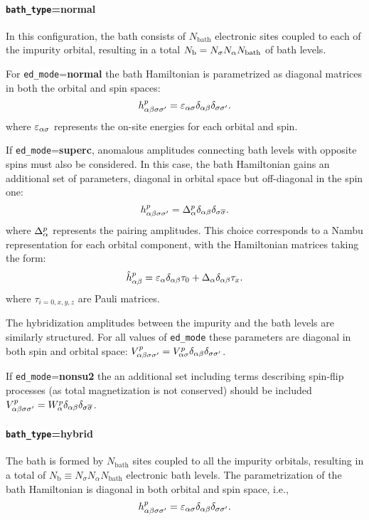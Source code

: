 \documentclass[edipack2.tex]{subfiles}
\begin{document}
\paragraph{{\tt bath\_type}={\bf normal}} In this configuration, the
bath consists of $N_\mathrm{bath}$
electronic sites coupled to each of the impurity orbital, resulting
in a total  $N_\mathrm{b} = N_\sigma N_\alpha N_\mathrm{bath}$ of bath levels.

For {\tt ed\_mode}={\bf normal} the bath Hamiltonian is parametrized
as diagonal matrices in both the orbital and spin spaces:
$$
h^p_{\alpha\beta\sigma\sigma'}=\varepsilon_{\alpha\sigma}\delta_{\alpha\beta}\delta_{\sigma\sigma'} .
$$
where $\varepsilon_{\alpha\sigma}$ represents  the on-site energies for each orbital and spin.

If {\tt ed\_mode}={\bf superc},  anomalous
amplitudes connecting bath levels with opposite spins must also be
considered. In this case, the bath Hamiltonian gains 
an additional set of parameters, diagonal in orbital space but
off-diagonal in the spin one:
$$
h^p_{\alpha\beta\sigma\sigma'}=\Delta^p_{\alpha}\delta_{\alpha\beta}\delta_{\sigma \overline{\sigma}} .
$$
where $\Delta^p_\alpha$ represents the pairing amplitudes. 
This choice corresponds to a Nambu representation for each orbital component,
with the Hamiltonian matrices taking the form:
$$
\hat{h}^p_{\alpha\beta} = \varepsilon_{\alpha}\delta_{\alpha\beta}\tau_0 +
\Delta_{\alpha}\delta_{\alpha\beta}\tau_x .
$$
where $\tau_{i=0,x,y,z}$ are Pauli matrices.

The hybridization amplitudes between the impurity and the bath levels
are similarly structured. For all values of {\tt ed\_mode} these
parameters are diagonal in both
spin and orbital space: $V^p_{\alpha\beta\sigma\sigma'}=V^p_{\alpha\sigma}\delta_{\alpha\beta}\delta_{\sigma\sigma'}$.

If {\tt ed\_mode}={\bf nonsu2} the an additional set including terms
describing spin-flip processes (as total magnetization is not
conserved) should be included $V^p_{\alpha\beta\sigma\sigma'} =
W^p_{\alpha}\delta_{\alpha\beta}\delta_{\sigma \overline{\sigma}}$. 



\paragraph{{\tt bath\_type}={\bf hybrid}}
The bath is formed by $N_\mathrm{bath}$ sites coupled to all the
impurity orbitals, resulting in a total of %
$N_\mathrm{b}\equiv N_\sigma N_\alpha N_\mathrm{bath}$ electronic bath levels. 
The parametrization of the bath Hamiltonian is 
diagonal in both orbital and spin space, i.e.,
$$
h^p_{\alpha\beta\sigma\sigma'}=\varepsilon_{\alpha\sigma}\delta_{\alpha\beta}\delta_{\sigma\sigma'}.
$$
\end{document}
